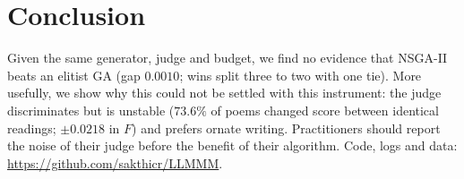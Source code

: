 \documentclass[sigconf,nonacm]{acmart}
\begin{document}
\section{Conclusion}
Given the same generator, judge and budget, we find no evidence that NSGA-II beats an elitist GA (gap $0.0010$; wins split three to two with one tie). More usefully, we show why this could not be settled with this instrument: the judge discriminates but is unstable ($73.6\%$ of poems changed score between identical readings; $\pm0.0218$ in $F$) and prefers ornate writing. Practitioners should report the noise of their judge before the benefit of their algorithm. Code, logs and data: \url{https://github.com/sakthicr/LLMMM}.



\end{document}
